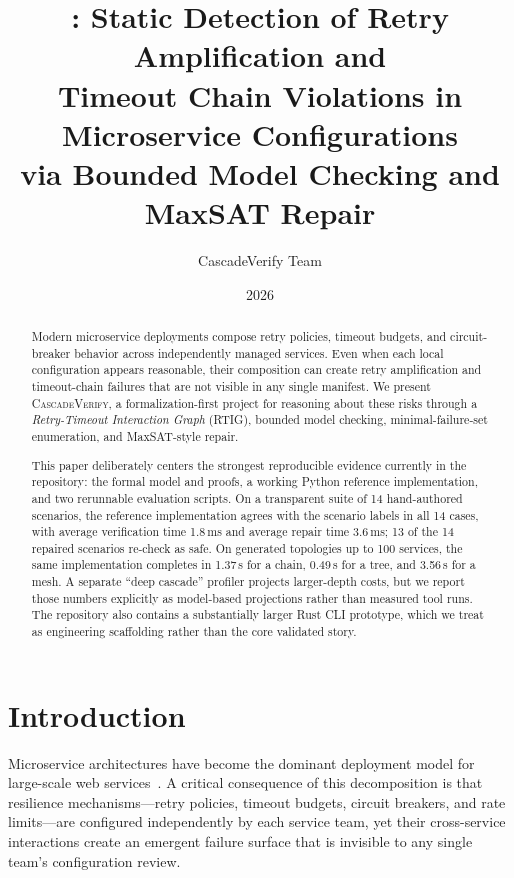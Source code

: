 \documentclass[10pt,twocolumn]{article}
\title{\tool: Static Detection of Retry Amplification and\\
Timeout Chain Violations in Microservice Configurations\\
via Bounded Model Checking and MaxSAT Repair}
\author{CascadeVerify Team}
\date{2026}
\newcommand{\tool}{\textsc{CascadeVerify}\xspace}
\newcommand{\rtig}{RTIG\xspace}
\begin{document}
\maketitle

\begin{abstract}
Modern microservice deployments compose retry policies, timeout budgets, and
circuit-breaker behavior across independently managed services.  Even when each
local configuration appears reasonable, their composition can create retry
amplification and timeout-chain failures that are not visible in any single
manifest.  We present \tool, a formalization-first project for reasoning about
these risks through a \emph{Retry-Timeout Interaction Graph} (\rtig), bounded
model checking, minimal-failure-set enumeration, and MaxSAT-style repair.

This paper deliberately centers the strongest reproducible evidence currently in
the repository: the formal model and proofs, a working Python reference
implementation, and two rerunnable evaluation scripts.  On a transparent suite
of 14 hand-authored scenarios, the reference implementation agrees with the
scenario labels in all 14 cases, with average verification time 1.8\,ms and
average repair time 3.6\,ms; 13 of the 14 repaired scenarios re-check as safe.
On generated topologies up to 100 services, the same implementation completes in
1.37\,s for a chain, 0.49\,s for a tree, and 3.56\,s for a mesh.  A separate
``deep cascade'' profiler projects larger-depth costs, but we report those
numbers explicitly as model-based projections rather than measured tool runs.
The repository also contains a substantially larger Rust CLI prototype, which we
treat as engineering scaffolding rather than the core validated story.
\end{abstract}

\section{Introduction}
\label{sec:intro}

Microservice architectures have become the dominant deployment model for
large-scale web services~\cite{newman2015microservices}. A critical consequence
of this decomposition is that resilience mechanisms---retry policies, timeout
budgets, circuit breakers, and rate limits---are configured independently by
each service team, yet their cross-service interactions create an emergent
failure surface that is invisible to any single team's configuration review.
\end{document}
